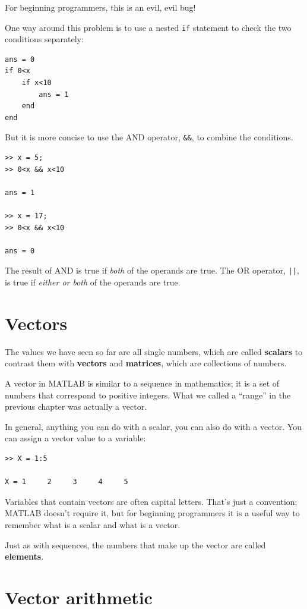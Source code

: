 \documentclass[
]{book}
\begin{document}
For beginning programmers, this is an evil, evil bug!

One way around this problem is to use a nested {\tt if} statement to
check the two conditions separately:

\begin{verbatim}
ans = 0
if 0<x
    if x<10
        ans = 1
    end
end
\end{verbatim}

But it is more concise to use the AND operator, {\tt \&\&}, to
combine the conditions.

\begin{verbatim}
>> x = 5;
>> 0<x && x<10

ans = 1

>> x = 17;
>> 0<x && x<10

ans = 0
\end{verbatim}

The result of AND is true if {\em both} of the operands are
true.  The OR operator, {\tt ||}, is true if {\em either or both}
of the operands are true.


\section{Vectors}

The values we have seen so far are all single numbers,
which are called {\bf scalars} to contrast them with {\bf vectors}
and {\bf matrices}, which are collections of numbers.

A vector in MATLAB is similar to a sequence in mathematics;
it is a set of numbers that correspond to positive integers.
What
we called a ``range'' in the previous chapter was actually a
vector.

In general, anything you can do with a scalar, you can also do with
a vector.  You can assign a vector value to a variable:

\begin{verbatim}
>> X = 1:5

X = 1     2     3     4     5
\end{verbatim}

Variables that contain vectors are often capital letters.  That's
just a convention; MATLAB doesn't require it, but for beginning
programmers it is a useful way to remember what is a scalar and
what is a vector.

Just as with sequences, the numbers that make up the vector are called
{\bf elements}.


\section{Vector arithmetic}
\end{document}
